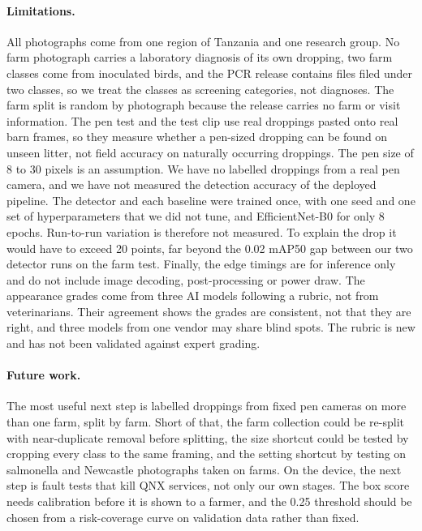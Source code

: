 \paragraph{Limitations.} All photographs come from one region of Tanzania and one research group. No farm photograph
carries a laboratory diagnosis of its own dropping, two farm classes come from inoculated birds, and the PCR release
contains files filed under two classes, so we treat the classes as screening categories, not diagnoses. The farm
split is random by photograph because the release carries no farm or visit information. The pen test and the test
clip use real droppings pasted onto real barn frames, so they measure whether a pen-sized dropping can be found on
unseen litter, not field accuracy on naturally occurring droppings. The pen size of 8 to 30 pixels is an assumption.
We have no labelled droppings from a real pen camera, and we have not measured the detection accuracy of the deployed
pipeline. The detector and each baseline were trained once, with one seed and one set of hyperparameters that we did
not tune, and EfficientNet-B0 for only 8 epochs. Run-to-run variation is therefore not measured. To explain the drop it
would have to exceed 20 points, far beyond the 0.02 mAP50 gap between our two detector runs on the farm test.
Finally, the edge timings are for inference only and do not include image decoding, post-processing or power draw.
The appearance grades come from three AI models following a rubric, not from veterinarians. Their agreement shows
the grades are consistent, not that they are right, and three models from one vendor may share blind spots. The
rubric is new and has not been validated against expert grading.

\paragraph{Future work.} The most useful next step is labelled droppings from fixed pen cameras on more than one
farm, split by farm. Short of that, the farm collection could be re-split with near-duplicate removal before
splitting, the size shortcut could be tested by cropping every class to the same framing, and the setting shortcut by
testing on salmonella and Newcastle photographs taken on farms. On the device, the next step is fault tests that kill QNX services, not only our own stages. The box score needs
calibration before it is shown to a farmer, and the 0.25 threshold should be chosen from a risk-coverage curve on
validation data rather than fixed.

